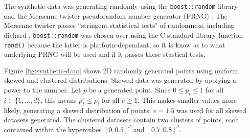 The synthetic data was generating randomly using the \texttt{boost::random} library and the Mersenne twister pseudorandom number generator (PRNG) \cite{mersenne-twister}.  The Mersenne twister passes ``stringent statistical tests" of randomness, including diehard \cite{mersenne-twister}. \texttt{boost::random} was chosen over using the C standard library function \texttt{rand()} because the latter is platform-dependant, so it is know as to what underlying PRNG will be used and if it passes these stastical tests.

Figure \ref{fig:synthetic-data} shows 2D randomly generated points using uniform, skewed and clustered distributions. Skewed data was generated by applying a power to the number. Let $p$ be a generated point. Since $0 \leq p_i \leq 1$ for all $i \in \lbrace 1, ..., d \rbrace$, this means $p_i^e \leq p_i$ for all $e \geq 1$. This makes smaller values more likely, generating a skewed distribution of points. $e = 1.5$ was used for all skewed datasets generated. The clustered datasets contain two clusters of points, each contained within the hypercubes $[0,0.5]^d$ and $[0.7,0.8]^d$.

